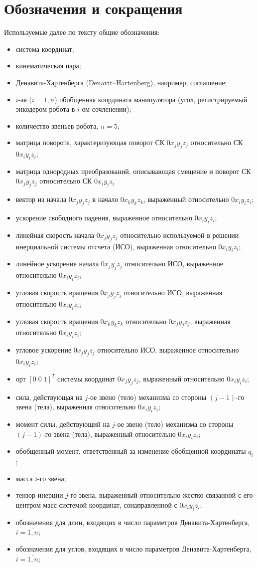 \section*{Обозначения и сокращения}
Используемые далее по тексту общие обозначения:
\newcommand*{\ditem}[1]{\item[#1~---]}
\begin{itemize}
\ditem{СК} система координат;
\ditem{КП} кинематическая пара;
\ditem{ДХ} Денавита-Хартенберга (Denavit–Hartenberg), например, соглашение;
\ditem{$q_i$} $i$-ая ($i=\overline{1,n}$) обобщенная координата манипулятора (угол, регистрируемый энкодером робота в $i$-ом сочленении);
\ditem{$n$} количество звеньев робота, $n = 5$;
\ditem{${}^iR_j$} матрица поворота, характеризующая поворот СК $0x_{j}y_{j}z_{j}$ относительно СК $0x_{i}y_{i}z_{i}$;
\ditem{${}^iA_j$} матрица однородных преобразований, описывающая смещение и поворот СК $0x_{j}y_{j}z_{j}$ относительно СК $0x_{i}y_{i}z_{i}$
\ditem{$r^i_{j,\,k}$} вектор из начала $0x_{j}y_{j}z_{j}$ в начало $0x_{k}y_{k}z_{k}$, выраженный относительно  $0x_{i}y_{i}z_{i}$;
\ditem{$g_i$} ускорение свободного падения, выраженное относительно $0x_{i}y_{i}z_{i}$;
\ditem{$V^i_j$} линейная скорость начала $0x_{j}y_{j}z_{j}$ относительно используемой в решении инерциальной системы отсчета (ИСО), выраженная относительно $0x_{i}y_{i}z_{i}$;
\ditem{$a^i_j$} линейное ускорение начала $0x_{j}y_{j}z_{j}$ относительно ИСО, выраженное относительно $0x_{i}y_{i}z_{i}$;
\ditem{$\omega^i_j$} угловая скорость вращения $0x_{j}y_{j}z_{j}$ относительно ИСО, выраженная относительно $0x_{i}y_{i}z_{i}$;
\ditem{$\omega^i_{j,\,k}$} угловая скорость вращения $0x_{k}y_{k}z_{k}$ относительно $0x_{j}y_{j}z_{j}$, выраженная относительно $0x_{i}y_{i}z_{i}$;
\ditem{$\dot\omega^i_j$} угловое ускорение $0x_{j}y_{j}z_{j}$ относительно ИСО, выраженное относительно $0x_{i}y_{i}z_{i}$;
\ditem{$z^i_j$} орт $[0\;0\;1]^T$ системы координат $0x_{j}y_{j}z_{j}$, выраженный относительно $0x_{i}y_{i}z_{i}$;
\ditem{$f^i_j$} сила, действующая на $j$-ое звено (тело) механизма со стороны $(j-1)$-го звена (тела), выраженная относительно $0x_{i}y_{i}z_{i}$;
\ditem{$\tau^i_j$} момент силы, действующий на $j$-ое звено (тело) механизма со стороны ${(j-1)}$-го звена (тела), выраженный относительно $0x_{i}y_{i}z_{i}$;
\ditem{$\tau_i$} обобщенный момент, ответственный за изменение обобщенной координаты $q_i$;
\ditem{$m_i$} масса $i$-го звена;
\ditem{$\mathcal{I}^i_j$} тензор инерции $j$-го звена, выраженный относительно жестко связанной с его центром масс системой координат, сонаправленной с $0x_{i}y_{i}z_{i}$;
\ditem{$a_i, d_i$} обозначения для длин, входящих в число параметров Де\-на\-ви\-та-Хар\-тен\-бер\-га, $i=\overline{1,n}$;
\ditem{$\alpha_i, \theta_i$} обозначения для углов, входящих в число параметров Де\-на\-ви\-та-Хар\-тен\-бер\-га, $i=\overline{1,n}$;
\end{itemize}
\newpage
